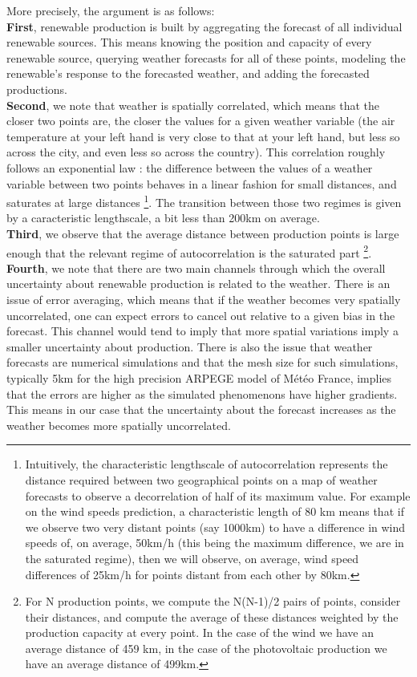 More precisely, the argument is as follows: \\
\textbf{First}, renewable production is built by aggregating the forecast of all individual renewable sources. This means knowing the position and capacity of every renewable source, querying weather forecasts for all of these points, modeling the renewable's response to the forecasted weather, and adding the forecasted productions. \\
\textbf{Second}, we note that weather is spatially correlated, which means that the closer two points are, the closer the values for a given weather variable (the air temperature at your left hand is very close to that at your left hand, but less so across the city, and even less so across the country). This correlation roughly follows an exponential law : the difference between the values of a weather variable between two points behaves in a linear fashion for small distances, and saturates at large distances \footnote{Intuitively, the characteristic lengthscale of autocorrelation represents the distance required between two geographical points on a map of weather forecasts to observe a decorrelation of half of its maximum value. For example on the wind speeds prediction, a characteristic length of 80 km means that if we observe two very distant points (say 1000km) to have a difference in wind speeds of, on average, 50km/h (this being the maximum difference, we are in the saturated regime), then we will observe, on average, wind speed differences of 25km/h for points distant from each other by 80km.}. The transition between those two regimes is given by a caracteristic lengthscale, a bit less than 200km on average. \\
\textbf{Third}, we observe that the average distance between production points is large enough that the relevant regime of autocorrelation is the saturated part \footnote{For N production points, we compute the N(N-1)/2 pairs of points, consider their distances, and compute the average of these distances weighted by the production capacity at every point. In the case of the wind we have an average distance of 459 km, in the case of the photovoltaic production we have an average distance of 499km.}. \\
\textbf{Fourth}, we note that there are two main channels through which the overall uncertainty about renewable production is related to the weather. There is an issue of error averaging, which means that if the weather becomes very spatially uncorrelated, one can expect errors to cancel out relative to a given bias in the forecast. This channel would tend to imply that more spatial variations imply a smaller uncertainty about production. There is also the issue that weather forecasts are numerical simulations and that the mesh size for such simulations, typically 5km for the high precision ARPEGE model of Météo France, implies that the errors are higher as the simulated phenomenons have higher gradients. This means in our case that the uncertainty about the forecast increases as the weather becomes more spatially uncorrelated. \\
